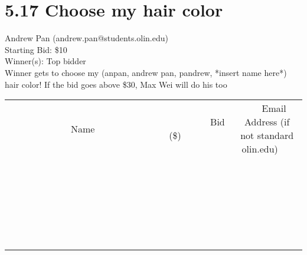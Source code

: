 \documentclass[11pt]{article}
\begin{document}
\section*{5.17 Choose my hair color}
Andrew Pan (andrew.pan@students.olin.edu) \\
Starting Bid: \$10 \\
Winner(s): 
Top bidder \\
Winner gets to choose my (anpan, andrew pan, pandrew, *insert name here*) hair color!  If the bid goes above \$30, Max Wei will do his too \\[6ex]
\begin{tabular}{c c c}
~~~~~~~~~~~~~Name~~~~~~~~~~~~~ & ~~~~~~~~~Bid (\$)~~~~~~~~~ & ~~~Email Address (if not standard olin.edu)~~~ \\
 & & \\
\hline
 & & \\
\hline
 & & \\
\hline
 & & \\
\hline
 & & \\
\hline
 & & \\
\hline
 & & \\
\hline
 & & \\
\hline
 & & \\
\hline
 & & \\
\hline
 & & \\
\hline
 & & \\
\hline
 & & \\
\hline
 & & \\
\hline
 & & \\
\hline
 & & \\
\hline
 & & \\
\hline
 & & \\
\hline
 & & \\
\hline
 & & \\
\hline
 & & \\
\hline
 & & \\
\hline
 & & \\
\hline
 & & \\
\hline
 & & \\
\hline
 & & \\
\hline
\end{tabular}
\clearpage
\end{document}
